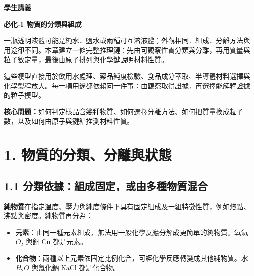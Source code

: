 \documentclass[11pt,a4paper]{article}
\providecommand{\tightlist}{%
  \setlength{\itemsep}{0pt}\setlength{\parskip}{0pt}}
\begin{document}
\begin{tcolorbox}[
  enhanced,colback=white,colframe=HandoutBlue,boxrule=1.1pt,arc=2mm,
  borderline west={3pt}{0pt}{HandoutBlue},left=5mm,right=4mm,top=4mm,bottom=4mm
]
{\sffamily\small\bfseries\color{HandoutBlue}學生講義}\par
{\sffamily\bfseries\LARGE\color{HandoutInk}必化-1 物質的分類與組成}\par
\vspace{0.35em}{\large 從可觀察的性質追到粒子組成，用分離、定量與鍵結解釋材料}\par
{}\par
{}\par
\end{tcolorbox}


一瓶透明液體可能是純水、鹽水或兩種可互溶液體；外觀相同，組成、分離方法與用途卻不同。本章建立一條完整推理鏈：先由可觀察性質分類與分離，再用質量與粒子數定量，最後由原子排列與化學鍵說明材料性質。

這些模型直接用於飲用水處理、藥品純度檢驗、食品成分萃取、半導體材料選擇與化學製程放大。每一項用途都依賴同一件事：由觀察取得證據，再選擇能解釋證據的粒子模型。

\textbf{核心問題：}如何判定樣品含幾種物質、如何選擇分離方法、如何把質量換成粒子數，以及如何由原子與鍵結推測材料性質。

\section{1. 物質的分類、分離與狀態}\label{ux7269ux8ceaux7684ux5206ux985eux5206ux96e2ux8207ux72c0ux614b}

\subsection{1.1 分類依據：組成固定，或由多種物質混合}\label{ux5206ux985eux4f9dux64daux7d44ux6210ux56faux5b9aux6216ux7531ux591aux7a2eux7269ux8ceaux6df7ux5408}

\textbf{純物質}在指定溫度、壓力與純度條件下具有固定組成及一組特徵性質，例如熔點、沸點與密度。純物質再分為：

\begin{itemize}
\tightlist
\item
  \textbf{元素}：由同一種元素組成，無法用一般化學反應分解成更簡單的純物質。氧氣 \(O_2\) 與銅 Cu 都是元素。
\item
  \textbf{化合物}：兩種以上元素依固定比例化合，可經化學反應轉變成其他純物質。水 \(H_2O\) 與氯化鈉 NaCl 都是化合物。
\end{itemize}
\end{document}
